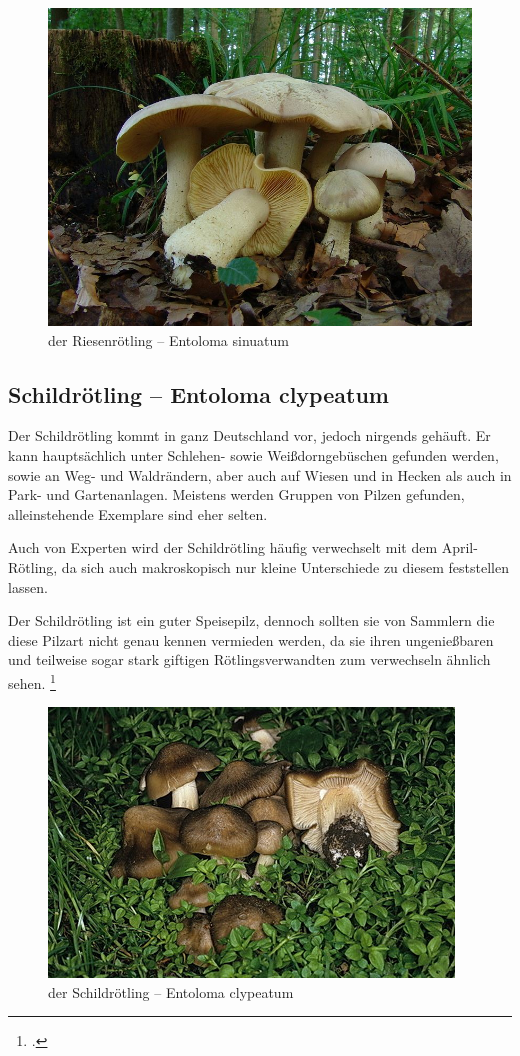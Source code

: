 \documentclass[a4paper,abstracton]{scrreprt}
\begin{document}
\begin{figure}[H]
\centering
\includegraphics[scale=0.3]{riesenroetling}
\caption{der Riesenrötling -- Entoloma sinuatum }
\label{fig:riesenroetling}
\end{figure}

\subsection{Schildrötling -- Entoloma clypeatum}
Der Schildrötling kommt in ganz Deutschland vor, jedoch nirgends gehäuft. Er kann hauptsächlich unter Schlehen- sowie Weißdorngebüschen gefunden werden, sowie an Weg- und Waldrändern, aber auch auf Wiesen und in Hecken als auch in Park- und Gartenanlagen. Meistens werden Gruppen von Pilzen gefunden, alleinstehende Exemplare sind eher selten. 

Auch von Experten wird der Schildrötling häufig verwechselt mit dem April-Rötling, da sich auch makroskopisch nur kleine Unterschiede zu diesem feststellen lassen.

Der Schildrötling ist ein guter Speisepilz, dennoch sollten sie von Sammlern die diese Pilzart nicht genau kennen vermieden werden, da sie ihren ungenießbaren und teilweise sogar stark giftigen Rötlingsverwandten zum verwechseln ähnlich sehen.
\footcite{schildroetling}

\begin{figure}[H]
\centering
\includegraphics[scale=34]{schildroetling}
\caption{der Schildrötling -- Entoloma clypeatum }
\label{fig:schildroetling}
\end{figure}
\end{document}
